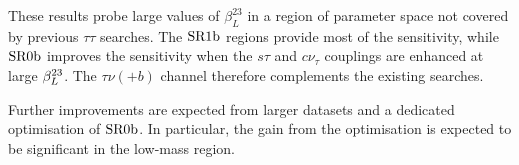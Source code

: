These results probe large values of $\beta_L^{23}$ in a region of parameter space not covered by previous $\tau\tau$ searches.
The $\mathrm{SR1b}$ regions provide most of the sensitivity, while $\mathrm{SR0b}$ improves the sensitivity when the $s\tau$ and $c\nu_\tau$ couplings are enhanced at large $\beta_L^{23}$.
The $\tau\nu(+b)$ channel therefore complements the existing searches.

Further improvements are expected from larger datasets and a dedicated optimisation of $\mathrm{SR0b}$. In particular, the gain from the optimisation is expected to be significant in the low-mass region.
